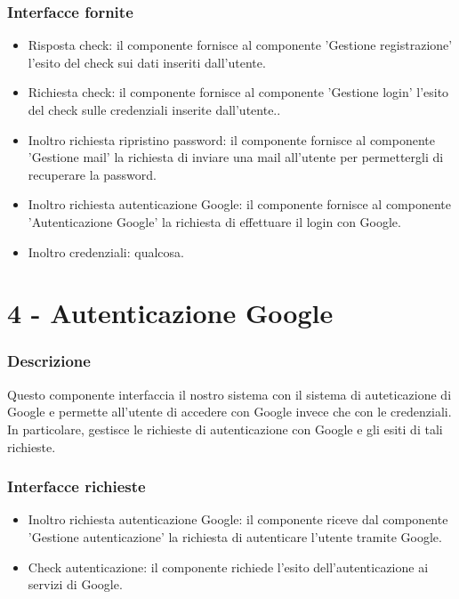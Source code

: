 \documentclass[a4paper,12pt]{article}
\begin{document}
\subsubsection*{Interfacce fornite}
\begin{itemize} \setlength\itemsep{0.01em}
\item {\sffamily Risposta check}: il componente fornisce al componente 'Gestione registrazione' l'esito del check sui dati inseriti dall'utente.
\item {\sffamily Richiesta check}:  il componente fornisce al componente 'Gestione login' l'esito del check sulle credenziali inserite dall'utente..
\item {\sffamily Inoltro richiesta ripristino password}: il componente fornisce al componente 'Gestione mail' la richiesta di inviare una mail all'utente per permettergli di recuperare la password.
\item {\sffamily Inoltro richiesta autenticazione Google}: il componente fornisce al componente 'Autenticazione Google' la richiesta di effettuare il login con Google.
\item {\sffamily Inoltro credenziali}: qualcosa.

\end{itemize}

\section*{4 -  Autenticazione  Google}
\subsubsection*{Descrizione}
Questo componente interfaccia il nostro sistema con il sistema di auteticazione di Google e permette all'utente di accedere con Google invece che con le credenziali. In particolare, gestisce le richieste di autenticazione con Google e gli esiti di tali richieste. 
\subsubsection*{Interfacce richieste}
\begin{itemize} \setlength\itemsep{0.01em}
\item {\sffamily Inoltro richiesta autenticazione Google}: il componente riceve dal componente 'Gestione autenticazione' la richiesta di autenticare l'utente tramite Google.
\item {\sffamily Check autenticazione}: il componente richiede l'esito dell'autenticazione ai servizi di Google.

\end{itemize}
\end{document}
